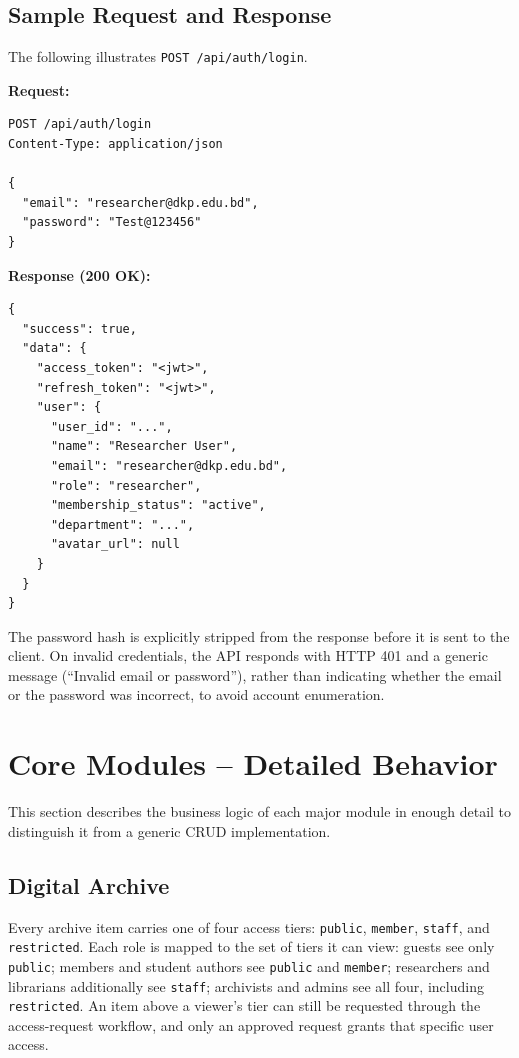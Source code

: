 \documentclass[12pt]{article}
\begin{document}
\subsection{Sample Request and Response}
The following illustrates \texttt{POST /api/auth/login}.

\textbf{Request:}
\begin{verbatim}
POST /api/auth/login
Content-Type: application/json

{
  "email": "researcher@dkp.edu.bd",
  "password": "Test@123456"
}
\end{verbatim}

\textbf{Response (200 OK):}
\begin{verbatim}
{
  "success": true,
  "data": {
    "access_token": "<jwt>",
    "refresh_token": "<jwt>",
    "user": {
      "user_id": "...",
      "name": "Researcher User",
      "email": "researcher@dkp.edu.bd",
      "role": "researcher",
      "membership_status": "active",
      "department": "...",
      "avatar_url": null
    }
  }
}
\end{verbatim}

The password hash is explicitly stripped from the response before it is sent to the client. On invalid credentials, the API responds with HTTP 401 and a generic message (``Invalid email or password''), rather than indicating whether the email or the password was incorrect, to avoid account enumeration.

\section{Core Modules -- Detailed Behavior}

This section describes the business logic of each major module in enough detail to distinguish it from a generic CRUD implementation.

\subsection{Digital Archive}
Every archive item carries one of four access tiers: \texttt{public}, \texttt{member}, \texttt{staff}, and \texttt{restricted}. Each role is mapped to the set of tiers it can view: guests see only \texttt{public}; members and student authors see \texttt{public} and \texttt{member}; researchers and librarians additionally see \texttt{staff}; archivists and admins see all four, including \texttt{restricted}. An item above a viewer's tier can still be requested through the access-request workflow, and only an approved request grants that specific user access.
\end{document}
